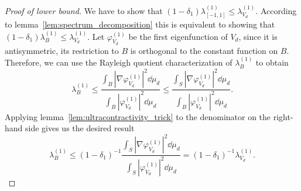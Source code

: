 \begin{proof}[Proof of lower bound]
    We have to show that \( (1-\delta_1)\lambda^{(1)}_{[-1,1]} \le \lambda^{(1)}_{V_d} \).
    According to lemma~\ref{lem:spectrum_decomposition} this is equivalent to showing that \( (1-\delta_1)\lambda^{(1)}_{B} \le \lambda^{(1)}_{V_d} \).
    Let \( \varphi_{V_d}^{(1)} \) be the first eigenfunction of \( V_d \), since it is antisymmetric, its restriction to \( B \) is orthogonal to the constant function on \( B \).
    Therefore, we can use the Rayleigh quotient characterization of \( \lambda^{(1)}_{B} \) to obtain
    \begin{equation*}
        \lambda^{(1)}_{B}
        \le \frac{\int_{B} |\nabla\varphi_{V_d}^{(1)}|^2 \dd{\mu_d}}{\int_{B} |\varphi_{V_d}^{(1)}|^2 \dd{\mu_d}}
        \le \frac{\int_{S} |\nabla\varphi_{V_d}^{(1)}|^2 \dd{\mu_d}}{\int_{B} |\varphi_{V_d}^{(1)}|^2 \dd{\mu_d}}.
    \end{equation*}
    Applying lemma~\ref{lem:ultracontractivity_trick} to the denominator on the right-hand side gives us the desired result
    \begin{equation*}
        \lambda^{(1)}_{B} \le (1-\delta_1)^{-1} \frac{\int_{S} |\nabla\varphi_{V_d}^{(1)}|^2 \dd{\mu_d}}{\int_{S} |\varphi_{V_d}^{(1)}|^2 \dd{\mu_d}} = (1-\delta_1)^{-1}\lambda^{(1)}_{V_d}.
    \end{equation*}
\end{proof}


